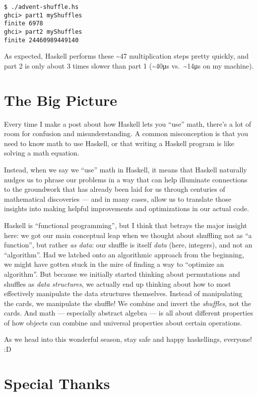 \documentclass[]{article}
\begin{document}
\begin{verbatim}
$ ./advent-shuffle.hs
ghci> part1 myShuffles
finite 6978
ghci> part2 myShuffles
finite 24460989449140
\end{verbatim}

As expected, Haskell performs these \textasciitilde47 multiplication steps
pretty quickly, and part 2 is only about 3 times slower than part 1
(\textasciitilde40μs vs.~\textasciitilde14μs on my machine).

\hypertarget{the-big-picture}{%
\section{The Big Picture}\label{the-big-picture}}

Every time I make a post about how Haskell lets you ``use'' math, there's a lot
of room for confusion and misunderstanding. A common misconception is that you
need to know math to use Haskell, or that writing a Haskell program is like
solving a math equation.

Instead, when we say we ``use'' math in Haskell, it means that Haskell naturally
nudges us to phrase our problems in a way that can help illuminate connections
to the groundwork that has already been laid for us through centuries of
mathematical discoveries --- and in many cases, allow us to translate those
insights into making helpful improvements and optimizations in our actual code.

Haskell is ``functional programming'', but I think that betrays the major
insight here: we got our main conceptual leap when we thought about shuffling
not as ``a function'', but rather \emph{as data}: our shuffle is itself
\emph{data} (here, integers), and not an ``algorithm''. Had we latched onto an
algorithmic approach from the beginning, we might have gotten stuck in the mire
of finding a way to ``optimize an algorithm''. But because we initially started
thinking about permutations and shuffles as \emph{data structures}, we actually
end up thinking about how to most effectively manipulate the data structures
themselves. Instead of manipulating the cards, we manipulate the shuffle! We
combine and invert the \emph{shuffles}, not the cards. And math --- especially
abstract algebra --- is all about different properties of how objects can
combine and universal properties about certain operations.

As we head into this wonderful season, stay safe and happy haskellings,
everyone! :D

\hypertarget{special-thanks}{%
\section{Special Thanks}\label{special-thanks}}
\end{document}
